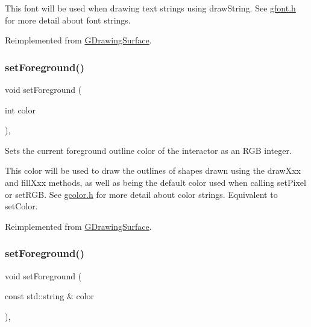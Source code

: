 This font will be used when drawing text strings using draw\+String. See \mbox{\hyperlink{gfont_8h_source}{gfont.\+h}} for more detail about font strings. 

Reimplemented from \mbox{\hyperlink{classGDrawingSurface_a8e096e8818d838aceae1d46d58fb3a7b}{G\+Drawing\+Surface}}.

\mbox{\label{classGCanvas_a59f7cd2bd1708c12dfa52a8f7c7b79c9}} 
\subsubsection{\texorpdfstring{set\+Foreground()}{setForeground()}\hspace{0.1cm}{\footnotesize\ttfamily [1/2]}}
{\footnotesize\ttfamily void set\+Foreground (\begin{DoxyParamCaption}\item[{int}]{color }\end{DoxyParamCaption})\hspace{0.3cm}{\ttfamily [override]}, {\ttfamily [virtual]}}



Sets the current foreground outline color of the interactor as an R\+GB integer. 

This color will be used to draw the outlines of shapes drawn using the draw\+Xxx and fill\+Xxx methods, as well as being the default color used when calling set\+Pixel or set\+R\+GB. See \mbox{\hyperlink{gcolor_8h_source}{gcolor.\+h}} for more detail about color strings. Equivalent to set\+Color. 

Reimplemented from \mbox{\hyperlink{classGDrawingSurface_a7daa57084b5811b598fce8726660b328}{G\+Drawing\+Surface}}.

\mbox{\label{classGCanvas_a8afbcf1f47750fb4c717f9ff36540235}} 
\subsubsection{\texorpdfstring{set\+Foreground()}{setForeground()}\hspace{0.1cm}{\footnotesize\ttfamily [2/2]}}
{\footnotesize\ttfamily void set\+Foreground (\begin{DoxyParamCaption}\item[{const std\+::string \&}]{color }\end{DoxyParamCaption})\hspace{0.3cm}{\ttfamily [override]}, {\ttfamily [virtual]}}



